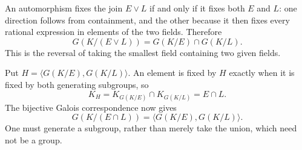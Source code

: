 An automorphism fixes the join $E\vee L$ if and only if it fixes both $E$ and $L$: one direction follows from containment, and the other because it then fixes every rational expression in elements of the two fields. Therefore
\[G(K/(E\vee L))=G(K/E)\cap G(K/L).\]
This is the reversal of taking the smallest field containing two given fields.

Put $H=\langle G(K/E),G(K/L)\rangle$. An element is fixed by $H$ exactly when it is fixed by both generating subgroups, so
\[K_H=K_{G(K/E)}\cap K_{G(K/L)}=E\cap L.\]
The bijective Galois correspondence now gives
\[G(K/(E\cap L))=\langle G(K/E),G(K/L)\rangle.\]
One must generate a subgroup, rather than merely take the union, which need not be a group.
